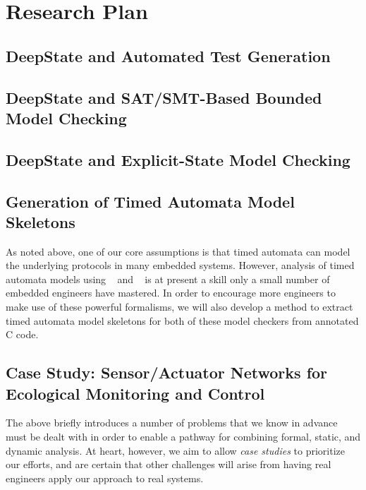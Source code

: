 \section{Research Plan}

%

\subsection{DeepState and Automated Test Generation}
\label{sec:framac2deepstate}


\subsection{DeepState and SAT/SMT-Based Bounded Model Checking}


\subsection{DeepState and Explicit-State Model Checking}


\subsection{Generation of Timed Automata Model Skeletons}
As noted above, one of our core assumptions is that timed automata can
model the underlying protocols in many embedded systems.  However,
analysis of timed automata models using \uppaal~\cite{uppaal} and
\prism~\cite{KNP2011:CAV} is at present a skill only a small number of
embedded engineers have mastered.  In order to encourage more
engineers to make use of these powerful formalisms, we will also
develop a method to extract timed automata model skeletons for both of these
model checkers from annotated C code.  

\subsection{Case Study: Sensor/Actuator Networks for Ecological Monitoring and Control}
\label{sec:case-study}

The above briefly introduces a number of problems that we know in advance must
be dealt with in order to enable a pathway for combining formal,
static, and dynamic analysis.    At heart, however, we aim to allow
\emph{case studies} to prioritize our efforts, and
are certain that other challenges will arise from having real
engineers apply our approach to real systems.

